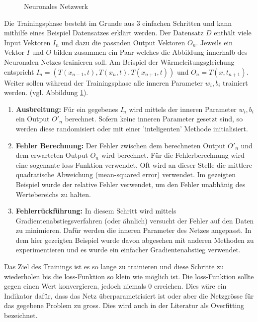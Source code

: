 	\begin{figure}[h]
		\centering
		
		\label{fig:mst_neuronalnetwork}
		\caption{Neuronales Netzwerk}
	\end{figure}
	
	Die Trainingsphase besteht im Grunde aus 3 einfachen Schritten und kann mithilfe eines Beispiel Datensatzes erklärt werden. Der Datensatz $D$ enthält viele Input Vektoren $I_n$ und dazu die passnden Output Vektoren $O_n$. Jeweils ein Vektor $I$ und $O$ bilden zusammen ein Paar welches die Abbildung innerhalb des Neuronalen Netzes trainieren soll. Am Beispiel der Wärmeleitungsgleichung entspricht $I_n = (T(x_{n-1}, t), T(x_{n}, t), T(x_{n+1}, t))$ und $O_n = T(x, t_{n+1})$. Weiter sollen während der Trainingsphase alle inneren Parameter $w_{i}, b_{i}$ trainiert werden. (vgl. Abbildung \ref{fig:mst_neuronalnetwork}).
	\begin{enumerate}
		\item {\textbf{Ausbreitung:} Für ein gegebenes $I_{n}$ wird mittels der inneren Parameter $w_{i}, b_{i}$ ein Output $O'_{n}$ berechnet. Sofern keine inneren Parameter gesetzt sind, so werden diese randomisiert oder mit einer 'inteligenten' Methode initialisiert.}
		\item {\textbf{Fehler Berechnung:} Der Fehler zwischen dem berechneten Output $O'_{n}$ und dem erwarteten Output $O_{n}$ wird berechnet. Für die Fehlerberechnung wird eine sogenante loss-Funktion verwendet. Oft wird an dieser Stelle die mittlere quadratische Abweichung (mean-squared error) verwendet. Im gezeigten Beispiel wurde der relative Fehler verwendet, um den Fehler unabhänig des Wertebereichs zu halten.}
		\item{ \textbf{ Fehlerrückführung:} In diesem Schritt wird mittels Gradientenabstiegsverfahren (oder ähnlich) versucht der Fehler auf den Daten zu minimieren. Dafür werden die inneren Parameter des Netzes angepasst. In dem hier gezeigten Beispiel wurde davon abgesehen mit anderen Methoden zu experimentieren und es wurde ein einfacher Gradientenabstieg verwendet.}
	\end{enumerate}
	Das Ziel des Trainings ist es so lange zu trainieren und diese Schritte zu wiederholen bis die loss-Funktion so klein wie möglich ist. Die loss-Funktion sollte gegen einen Wert konvergieren, jedoch niemals 0 erreichen. Dies wäre ein Indikator dafür, dass das Netz überparametrisiert ist oder aber die Netzgrösse für das gegebene Problem zu gross. Dies wird auch in der Literatur als Overfitting bezeichnet.
	
